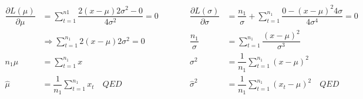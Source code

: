 \documentclass[12pt, letterpaper]{article}
\begin{document}
      \begin{align*}
        \dfrac{\partial L(\mu)}{\partial \mu} & =\sum_{t=1}^{n1}\dfrac{2(x - \mu)2\sigma^2 - 0}{4\sigma^2} = 0 \quad&\quad\quad \dfrac{\partial L(\sigma)}{\partial\sigma} & = \dfrac{n_1}{\sigma} + \sum_{t=1}^{n_1} \dfrac{0 - (x - \mu)^2 4\sigma}{4\sigma^4}  = 0
        \\
        & \Rightarrow \sum_{t=1}^{n_1} 2(x - \mu)2\sigma^2 = 0 \quad&\quad\quad
        \dfrac{n_1}{\sigma} & = \sum_{t=1}^{n_1} \dfrac{(x-\mu)^2}{\sigma^3}
        \\
        n_1\mu & = \sum_{t=1}^{n_1} x \quad&\quad\quad \sigma^2 &= \dfrac{1}{n_1}\sum_{t=1}^{n_1} (x-\mu)^2
        \\
        \hat{\mu} & = \dfrac{1}{n_1}\sum_{t=1}^{n_1} x_t \quad QED &\quad\quad
        \hat{\sigma}^2 &= \dfrac{1}{n_1}\sum_{t=1}^{n_1} (x_t-\mu)^2 \quad QED
      \end{align*}
\end{document}
